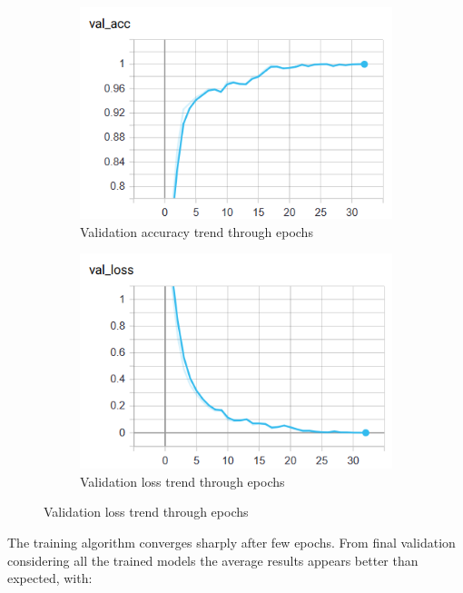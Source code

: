 \begin{center}
	\begin{figure}[H]
		\begin{subfigure}[H]{0.45\textwidth}
			\hfill\includegraphics[scale=0.6]{figures/last_model_val_acc.png}\vspace*{\fill}
			\caption{Validation accuracy trend through epochs}\label{fig:8a}
		\end{subfigure}
		\begin{subfigure}[H]{0.45\textwidth}
			\hfill\includegraphics[scale=0.6]{figures/last_model_val_loss.png}\vspace*{\fill}
			\caption{Validation loss trend through epochs}\label{fig:8b}
		\end{subfigure}
	\end{figure} 
\end{center}
The training algorithm converges sharply after few epochs. From final validation considering all the trained models the average results appears better than expected, with:\\


